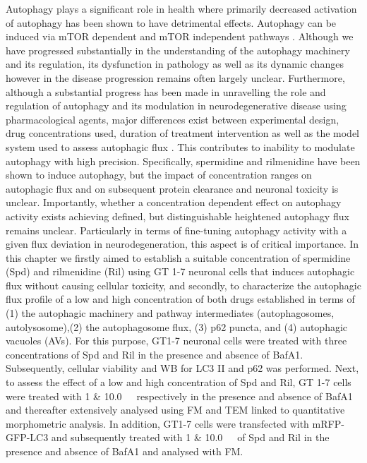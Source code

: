 Autophagy plays a significant role in health where primarily decreased activation of autophagy has been shown to have detrimental effects. Autophagy can be induced via mTOR dependent and mTOR independent pathways \citep{sarkar2013}. Although we have progressed substantially in the understanding of the autophagy machinery and its regulation, its dysfunction in pathology as well as its dynamic changes however in the disease progression remains often largely unclear. Furthermore, although a substantial progress has been made in unravelling the role and regulation of autophagy and its modulation in neurodegenerative disease using pharmacological agents, major differences exist between experimental design, drug concentrations used, duration of treatment intervention as well as the model system used to assess autophagic flux \citep{lumkwana2017}. This contributes to inability to modulate autophagy with high precision. Specifically, spermidine and rilmenidine have been shown to induce autophagy, but the impact of concentration ranges on autophagic flux and on subsequent protein clearance and neuronal toxicity is unclear. Importantly, whether a concentration dependent effect on autophagy activity exists achieving defined, but distinguishable heightened autophagy flux remains unclear. Particularly in terms of fine-tuning autophagy activity with a given flux deviation in neurodegeneration, this aspect is of critical importance. In this chapter we firstly aimed to establish a suitable concentration of spermidine (Spd) and rilmenidine (Ril) using GT 1-7 neuronal cells that induces autophagic flux without causing cellular toxicity, and secondly, to characterize the autophagic flux profile of a low and high concentration of both drugs established in terms of (1) the autophagic machinery and pathway intermediates (autophagosomes, autolysosome),(2) the autophagosome flux, (3) p62 puncta, and (4) autophagic vacuoles (AVs). For this purpose, GT1-7 neuronal cells were treated with three concentrations of Spd and Ril in the presence and absence of BafA1. Subsequently, cellular viability and WB for LC3 II and p62 was performed. Next, to assess the effect of a low and high concentration of Spd and Ril, GT 1-7 cells were treated with 1 \& \SI{10.0}{\mu\Molar}\ respectively in the presence and absence of BafA1 and thereafter extensively analysed using FM and TEM linked to quantitative morphometric analysis. In addition, GT1-7 cells were transfected with mRFP-GFP-LC3 \citep{yoshii2017} and subsequently treated with 1 \& \SI{10.0}{\mu\Molar}\ of Spd and Ril in the presence and absence of BafA1 and analysed with FM.
 
